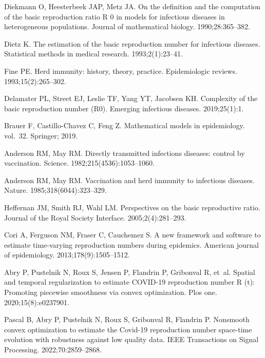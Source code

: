 \begin{thebibliography}{10}

Diekmann O, Heesterbeek JAP, Metz JA.
\newblock On the definition and the computation of the basic reproduction ratio
  R 0 in models for infectious diseases in heterogeneous populations.
\newblock Journal of mathematical biology. 1990;28:365--382.

Dietz K.
\newblock The estimation of the basic reproduction number for infectious
  diseases.
\newblock Statistical methods in medical research. 1993;2(1):23--41.

Fine PE.
\newblock Herd immunity: history, theory, practice.
\newblock Epidemiologic reviews. 1993;15(2):265--302.

Delamater PL, Street EJ, Leslie TF, Yang YT, Jacobsen KH.
\newblock Complexity of the basic reproduction number (R0).
\newblock Emerging infectious diseases. 2019;25(1):1.

Brauer F, Castillo-Chavez C, Feng Z.
\newblock Mathematical models in epidemiology. vol.~32.
\newblock Springer; 2019.

Anderson RM, May RM.
\newblock Directly transmitted infections diseases: control by vaccination.
\newblock Science. 1982;215(4536):1053--1060.

Anderson RM, May RM.
\newblock Vaccination and herd immunity to infectious diseases.
\newblock Nature. 1985;318(6044):323--329.

Heffernan JM, Smith RJ, Wahl LM.
\newblock Perspectives on the basic reproductive ratio.
\newblock Journal of the Royal Society Interface. 2005;2(4):281--293.

Cori A, Ferguson NM, Fraser C, Cauchemez S.
\newblock A new framework and software to estimate time-varying reproduction
  numbers during epidemics.
\newblock American journal of epidemiology. 2013;178(9):1505--1512.

Abry P, Pustelnik N, Roux S, Jensen P, Flandrin P, Gribonval R, et~al.
\newblock Spatial and temporal regularization to estimate COVID-19 reproduction
  number R (t): Promoting piecewise smoothness via convex optimization.
\newblock Plos one. 2020;15(8):e0237901.

Pascal B, Abry P, Pustelnik N, Roux S, Gribonval R, Flandrin P.
\newblock Nonsmooth convex optimization to estimate the Covid-19 reproduction
  number space-time evolution with robustness against low quality data.
\newblock IEEE Transactions on Signal Processing. 2022;70:2859--2868.


\end{thebibliography}
